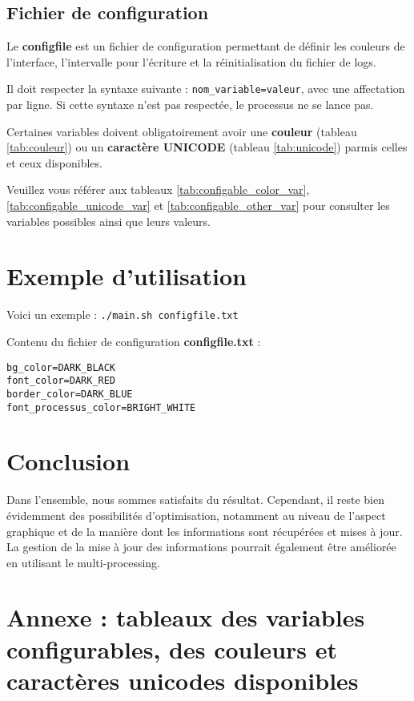 \documentclass{article}
\begin{document}
\subsection{Fichier de configuration}
Le \textbf{configfile} est un fichier de configuration permettant de définir les couleurs de l'interface, l'intervalle pour l'écriture et la réinitialisation du fichier de logs.
  
Il doit respecter la syntaxe suivante : \texttt{nom\_variable=valeur}, avec une affectation par ligne. Si cette syntaxe n'est pas respectée, le processus ne se lance pas.
\vspace{1em}

Certaines variables doivent obligatoirement avoir une \textbf{couleur} (tableau \ref{tab:couleur}) ou un \textbf{caractère UNICODE} (tableau \ref{tab:unicode}) parmis celles et ceux disponibles.
  
Veuillez vous référer aux tableaux \ref{tab:configable_color_var}, \ref{tab:configable_unicode_var} et \ref{tab:configable_other_var} pour consulter les variables possibles ainsi que leurs valeurs.

\section{Exemple d'utilisation}
Voici un exemple : \texttt{./main.sh configfile.txt}
  
\vspace{0.5em}
Contenu du fichier de configuration \textbf{configfile.txt} :
\begin{verbatim}
bg_color=DARK_BLACK
font_color=DARK_RED
border_color=DARK_BLUE
font_processus_color=BRIGHT_WHITE
\end{verbatim}


\section{Conclusion}
Dans l'ensemble, nous sommes satisfaits du résultat. Cependant, il reste bien évidemment des possibilités d'optimisation, notamment au niveau de l'aspect graphique
 et de la manière dont les informations sont récupérées et mises à jour. La gestion de la mise à jour des informations pourrait également être améliorée en utilisant le multi-processing.

\newpage
\section{Annexe : tableaux des variables configurables, des couleurs et caractères unicodes disponibles}
\vspace{3em}
\end{document}
